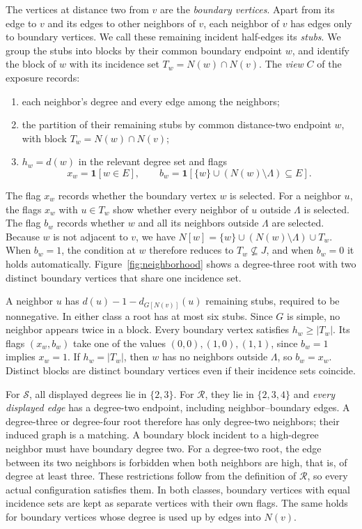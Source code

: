 \documentclass[11pt]{article}
\newcommand{\ind}{\mathbf1}\newcommand{\F}{\mathcal F}\newcommand{\V}{\mathcal V}
\begin{document}
The vertices at distance two from $v$ are the \emph{boundary vertices}. Apart from its edge to $v$ and its edges to other neighbors of $v$, each neighbor of $v$ has edges only to boundary vertices. We call these remaining incident half-edges its \emph{stubs}. We group the stubs into blocks by their common boundary endpoint $w$, and identify the block of $w$ with its incidence set $T_w=N(w)\cap N(v)$. The \emph{view} $C$ of the exposure records:
\begin{enumerate}[label=(\roman*),itemsep=2pt]
\item each neighbor's degree and every edge among the neighbors;
\item the partition of their remaining stubs by common distance-two endpoint $w$, with block $T_w=N(w)\cap N(v)$;
\item $h_w=d(w)$ in the relevant degree set and flags
\[
 x_w=\ind[w\in E],\qquad
 b_w=\ind[\{w\}\cup(N(w)\setminus \Lambda)\subseteq E].
\]
\end{enumerate}
The flag $x_w$ records whether the boundary vertex $w$ is selected. For a neighbor $u$, the flags $x_w$ with $u\in T_w$ show whether every neighbor of $u$ outside $\Lambda$ is selected. The flag $b_w$ records whether $w$ and all its neighbors outside $\Lambda$ are selected. Because $w$ is not adjacent to $v$, we have $N[w]=\{w\}\cup(N(w)\setminus \Lambda)\cup T_w$. When $b_w=1$, the condition at $w$ therefore reduces to $T_w\nsubseteq J$, and when $b_w=0$ it holds automatically. Figure~\ref{fig:neighborhood} shows a degree-three root with two distinct boundary vertices that share one incidence set.

A neighbor $u$ has $d(u)-1-d_{G[N(v)]}(u)$ remaining stubs, required to be nonnegative. In either class a root has at most six stubs. Since $G$ is simple, no neighbor appears twice in a block. Every boundary vertex satisfies $h_w\ge|T_w|$. Its flags $(x_w,b_w)$ take one of the values $(0,0),(1,0),(1,1)$, since $b_w=1$ implies $x_w=1$. If $h_w=|T_w|$, then $w$ has no neighbors outside $\Lambda$, so $b_w=x_w$. Distinct blocks are distinct boundary vertices even if their incidence sets coincide.

For $\mathcal S$, all displayed degrees lie in $\{2,3\}$. For $\mathcal R$, they lie in $\{2,3,4\}$ and \emph{every displayed edge} has a degree-two endpoint, including neighbor--boundary edges. A degree-three or degree-four root therefore has only degree-two neighbors; their induced graph is a matching. A boundary block incident to a high-degree neighbor must have boundary degree two. For a degree-two root, the edge between its two neighbors is forbidden when both neighbors are high, that is, of degree at least three. These restrictions follow from the definition of $\mathcal R$, so every actual configuration satisfies them. In both classes, boundary vertices with equal incidence sets are kept as separate vertices with their own flags. The same holds for boundary vertices whose degree is used up by edges into $N(v)$.
\end{document}
